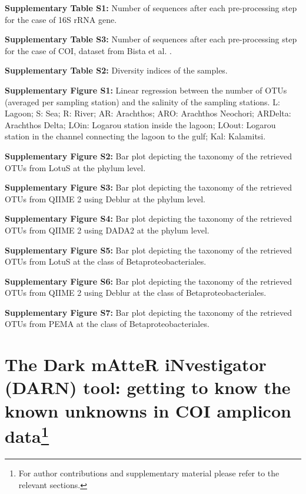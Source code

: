      \textbf{Supplementary Table S1:} Number of sequences after each pre-processing step for the case of 16S rRNA gene.

      \textbf{Supplementary Table S3:} Number of sequences after each pre-processing step for the case of COI, dataset from Bista et al. \citep{bista2017annual}.

      \textbf{Supplementary Table S2:} Diversity indices of the samples.

      \textbf{Supplementary Figure S1:} Linear regression between the number of OTUs (averaged per sampling station) and the salinity of the sampling stations. L: Lagoon; S: Sea; R: River; AR: Arachthos; ARO: Arachthos Neochori; ARDelta: Arachthos Delta; LOin: Logarou station inside the lagoon; LOout: Logarou station in the channel connecting the lagoon to the gulf; Kal: Kalamitsi.

      \textbf{Supplementary Figure S2:} Bar plot depicting the taxonomy of the retrieved OTUs from LotuS at the phylum level.

      \textbf{Supplementary Figure S3:} Bar plot depicting the taxonomy of the retrieved OTUs from QIIME 2 using Deblur at the phylum level.

      \textbf{Supplementary Figure S4:} Bar plot depicting the taxonomy of the retrieved OTUs from QIIME 2 using DADA2 at the phylum level.

      \textbf{Supplementary Figure S5:} Bar plot depicting the taxonomy of the retrieved OTUs from LotuS at the class of Betaproteobacteriales.

      \textbf{Supplementary Figure S6:} Bar plot depicting the taxonomy of the retrieved OTUs from QIIME 2 using Deblur at the class of Betaproteobacteriales.

      \textbf{Supplementary Figure S7:} Bar plot depicting the taxonomy of the retrieved OTUs from PEMA at the class of Betaproteobacteriales.




   \newpage


% 
% 

\newpage

\section[The Dark mAtteR iNvestigator (DARN) tool: getting to know the known unknowns in COI amplicon data]{
      The Dark mAtteR iNvestigator (DARN) tool: getting to know the known unknowns in COI amplicon data\footnote{
      For author contributions and supplementary material please refer to the relevant sections. 
   }
}
\label{publ:darn}


